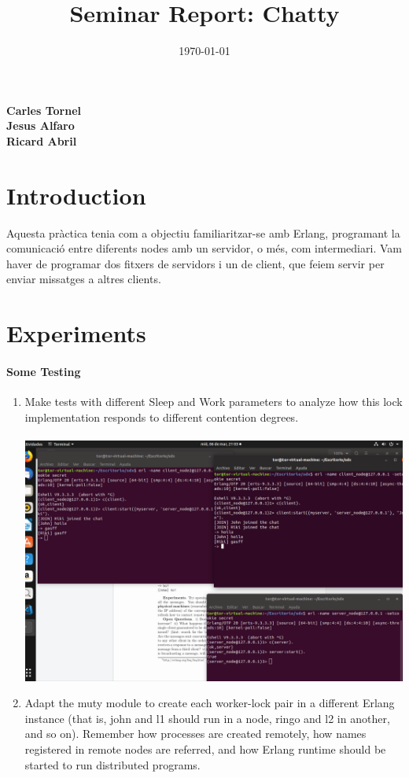 \documentclass[a4paper, 10pt]{article}
\title{Seminar Report: Chatty}
\date{\normalsize\today{}}
\begin{document}
\maketitle

\begin{center}
  \textbf{Carles Tornel}\\
  \textbf{Jesus Alfaro}\\
  \textbf{Ricard Abril}

\end{center}

\section{Introduction}

Aquesta pràctica tenia com a objectiu familiaritzar-se amb Erlang, programant la comunicació entre diferents nodes amb un servidor, o més, com intermediari. Vam haver de programar dos fitxers de servidors i un de client, que feiem servir per enviar missatges a altres clients.

\newpage
\section{Experiments}
\paragraph[bold]{Some Testing}
\begin{enumerate}
  \item Make tests with different Sleep and Work parameters to analyze how this lock implementation responds to different contention degrees.\\\\
  \includegraphics[width=\textwidth]{img1}\\


  \newpage\item Adapt the muty module to create each worker-lock pair in a different Erlang instance (that is, john and l1 should run in a node, ringo and l2 in another, and so on). Remember how processes are created remotely, how names registered in remote nodes are referred, and how Erlang runtime should be started to run distributed programs.  
\end{enumerate}
\end{document}

